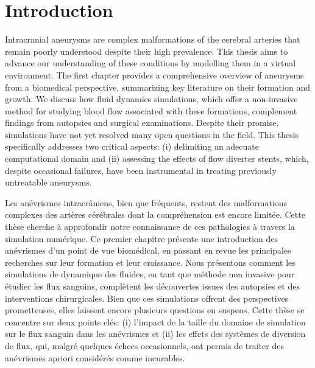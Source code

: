\newpage
\pagestyle{fancy}
\setcounter{page}{1}
\chapter{Introduction}
\minitoc\newpage\label{introduction}

\begin{tcolorbox}[abstract]

	Intracranial aneurysms are complex malformations of the cerebral arteries that remain poorly understood despite their high prevalence. This thesis aims to advance our understanding of these conditions by modelling them in a virtual environment. The first chapter provides a comprehensive overview of aneurysms from a biomedical perspective, summarizing key literature on their formation and growth. We discuss how fluid dynamics simulations, which offer a non-invasive method for studying blood flow associated with these formations, complement findings from autopsies and surgical examinations. Despite their promise, simulations have not yet resolved many open questions in the field. This thesis specifically addresses two critical aspects: (i) delimiting an adecuate computational domain and (ii) assessing the effects of flow diverter stents, which, despite occasional failures, have been instrumental in treating previously untreatable aneurysms.


	\tcblower

	Les anévrismes intracrâniens, bien que fréquents, restent des malformations complexes des artères cérébrales dont la compréhension est encore limitée. Cette thèse cherche à approfondir notre connaissance de ces pathologies à travers la simulation numérique. Ce premier chapitre présente une introduction des anévrismes d'un point de vue biomédical, en passant en revue les principales recherches sur leur formation et leur croissance. Nous présentons comment les simulations de dynamique des fluides, en tant que méthode non invasive pour étudier les flux sanguins, complètent les découvertes issues des autopsies et des interventions chirurgicales. Bien que ces simulations offrent des perspectives prometteuses, elles laissent encore plusieurs questions en suspens. Cette thèse se concentre sur deux points clés: (i) l'impact de la taille du domaine de simulation sur le flux sanguin dans les anévrismes et (ii) les effets des systèmes de diversion de flux, qui, malgré quelques échecs occasionnels, ont permis de traiter des anévrismes apriori considérés comme incurables.
\end{tcolorbox}

